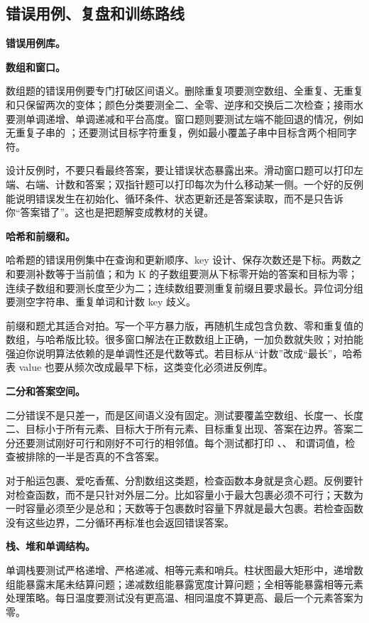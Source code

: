 \subsection{错误用例、复盘和训练路线}

\noindent\textbf{错误用例库。}

\noindent\textbf{数组和窗口。}

数组题的错误用例要专门打破区间语义。删除重复项要测空数组、全重复、无重复和只保留两次的变体；颜色分类要测全二、全零、逆序和交换后二次检查；接雨水要测单调递增、单调递减和平台高度。窗口题则要测试左端不能回退的情况，例如无重复子串的 ；还要测试目标字符重复，例如最小覆盖子串中目标含两个相同字符。

设计反例时，不要只看最终答案，要让错误状态暴露出来。滑动窗口题可以打印左端、右端、计数和答案；双指针题可以打印每次为什么移动某一侧。一个好的反例能说明错误发生在初始化、循环条件、状态更新还是答案读取，而不是只告诉你“答案错了”。这也是把题解变成教材的关键。

\noindent\textbf{哈希和前缀和。}

哈希题的错误用例集中在查询和更新顺序、key 设计、保存次数还是下标。两数之和要测补数等于当前值；和为 K 的子数组要测从下标零开始的答案和目标为零；连续子数组和要测长度至少为二；连续数组要测重复前缀且要求最长。异位词分组要测空字符串、重复单词和计数 key 歧义。

前缀和题尤其适合对拍。写一个平方暴力版，再随机生成包含负数、零和重复值的数组，与哈希版比较。很多窗口解法在正数数组上正确，一加负数就失败；对拍能强迫你说明算法依赖的是单调性还是代数等式。若目标从“计数”改成“最长”，哈希表 value 也要从频次改成最早下标，这类变化必须进反例库。

\noindent\textbf{二分和答案空间。}

二分错误不是只差一，而是区间语义没有固定。测试要覆盖空数组、长度一、长度二、目标小于所有元素、目标大于所有元素、目标重复出现、答案在边界。答案二分还要测试刚好可行和刚好不可行的相邻值。每个测试都打印 、、 和谓词值，检查被排除的一半是否真的不含答案。

对于船运包裹、爱吃香蕉、分割数组这类题，检查函数本身就是贪心题。反例要针对检查函数，而不是只针对外层二分。比如容量小于最大包裹必须不可行；天数为一时容量必须至少是总和；天数等于包裹数时容量下界就是最大包裹。若检查函数没有这些边界，二分循环再标准也会返回错误答案。

\noindent\textbf{栈、堆和单调结构。}

单调栈要测试严格递增、严格递减、相等元素和哨兵。柱状图最大矩形中，递增数组能暴露末尾未结算问题；递减数组能暴露宽度计算问题；全相等能暴露相等元素处理策略。每日温度要测试没有更高温、相同温度不算更高、最后一个元素答案为零。

